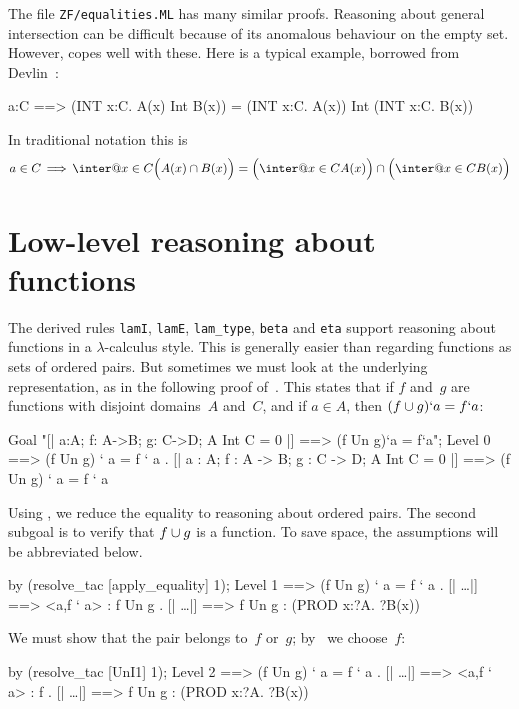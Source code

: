 The file \texttt{ZF/equalities.ML} has many similar proofs.  Reasoning about
general intersection can be difficult because of its anomalous behaviour on
the empty set.  However,  copes well with these.  Here is
a typical example, borrowed from Devlin~\cite[page 12]{devlin79}:
\begin{ttbox}
a:C ==> (INT x:C. A(x) Int B(x)) = (INT x:C. A(x)) Int (INT x:C. B(x))
\end{ttbox}
In traditional notation this is
\[ a\in C \,\Imp\, \inter@{x\in C} \Bigl(A(x) \int B(x)\Bigr) =        
       \Bigl(\inter@{x\in C} A(x)\Bigr)  \int  
       \Bigl(\inter@{x\in C} B(x)\Bigr)  \]

\section{Low-level reasoning about functions}
The derived rules \texttt{lamI}, \texttt{lamE}, \texttt{lam_type}, \texttt{beta}
and \texttt{eta} support reasoning about functions in a
$\lambda$-calculus style.  This is generally easier than regarding
functions as sets of ordered pairs.  But sometimes we must look at the
underlying representation, as in the following proof
of~.  This states that if $f$ and~$g$ are
functions with disjoint domains~$A$ and~$C$, and if $a\in A$, then
$(f\cup g)`a = f`a$:
\begin{ttbox}
Goal "[| a:A;  f: A->B;  g: C->D;  A Int C = 0 |] ==>  \ttback
\ttback    (f Un g)`a = f`a";
{\out Level 0}
{\out [| a : A; f : A -> B; g : C -> D; A Int C = 0 |]}
{\out ==> (f Un g) ` a = f ` a}
{. [| a : A; f : A -> B; g : C -> D; A Int C = 0 |]}
{\out     ==> (f Un g) ` a = f ` a}
\end{ttbox}
Using , we reduce the equality to reasoning about
ordered pairs.  The second subgoal is to verify that $f\cup g$ is a function.
To save space, the assumptions will be abbreviated below.
\begin{ttbox}
by (resolve_tac [apply_equality] 1);
{\out Level 1}
{\out [| \ldots |] ==> (f Un g) ` a = f ` a}
{. [| \ldots |] ==> <a,f ` a> : f Un g}
{. [| \ldots |] ==> f Un g : (PROD x:?A. ?B(x))}
\end{ttbox}
We must show that the pair belongs to~$f$ or~$g$; by~ we
choose~$f$:
\begin{ttbox}
by (resolve_tac [UnI1] 1);
{\out Level 2}
{\out [| \ldots |] ==> (f Un g) ` a = f ` a}
{. [| \ldots |] ==> <a,f ` a> : f}
{. [| \ldots |] ==> f Un g : (PROD x:?A. ?B(x))}
\end{ttbox}
